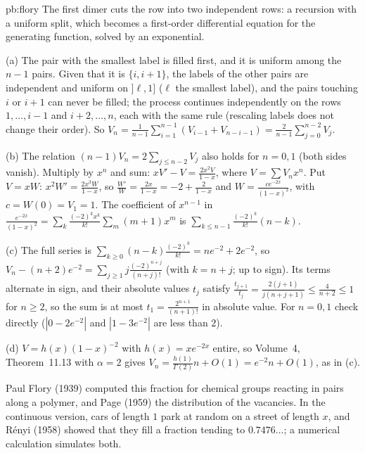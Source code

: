 \begin{solution}{pb:flory}
\idea The first dimer cuts the row into two independent rows: a recursion with a uniform split, which becomes a first-order differential equation for the generating
function, solved by an exponential.

\writeup (a) The pair with the smallest label is filled first, and it is uniform among the $n-1$ pairs. Given that it is $\{i,i+1\}$, the labels of the other pairs are independent and
uniform on $]\ell,1]$ ($\ell$ the smallest label), and the pairs touching $i$ or $i+1$ can never be filled; the process continues independently on the rows $1,\dots,i-1$ and
$i+2,\dots,n$, each with the same rule (rescaling labels does not change their order). So $V_n=\frac1{n-1}\sum_{i=1}^{n-1}(V_{i-1}+V_{n-i-1})=\frac2{n-1}\sum_{j=0}^{n-2}V_j$.

(b) The relation $(n-1)V_n=2\sum_{j\le n-2}V_j$ also holds for $n=0,1$ (both sides vanish). Multiply by $x^n$ and sum: $xV'-V=\frac{2x^2V}{1-x}$, where $V=\sum V_nx^n$. Put $V=xW$:
$x^2W'=\frac{2x^3W}{1-x}$, so $\frac{W'}W=\frac{2x}{1-x}=-2+\frac2{1-x}$ and $W=\frac{ce^{-2x}}{(1-x)^2}$, with $c=W(0)=V_1=1$. The coefficient of $x^{n-1}$ in $\frac{e^{-2x}}{(1-x)^2}=\sum_k\frac{(-2)^kx^k}{k!}\sum_m(m+1)x^m$ is
$\sum_{k\le n-1}\frac{(-2)^k}{k!}(n-k)$.

(c) The full series is $\sum_{k\ge0}(n-k)\frac{(-2)^k}{k!}=ne^{-2}+2e^{-2}$, so $V_n-(n+2)e^{-2}=\sum_{j\ge1}j\frac{(-2)^{n+j}}{(n+j)!}$ (with $k=n+j$; up to sign). Its terms alternate in sign, and their absolute values $t_j$
satisfy $\frac{t_{j+1}}{t_j}=\frac{2(j+1)}{j(n+j+1)}\le\frac4{n+2}\le1$ for $n\ge2$, so the sum is at most $t_1=\frac{2^{n+1}}{(n+1)!}$ in absolute value. For $n=0,1$ check directly ($|0-2e^{-2}|$ and $|1-3e^{-2}|$ are less than $2$).

(d) $V=h(x)(1-x)^{-2}$ with $h(x)=xe^{-2x}$ entire, so Volume~4, Theorem~11.13 with $\alpha=2$ gives $V_n=\frac{h(1)}{\Gamma(2)}n+O(1)=e^{-2}n+O(1)$, as in (c).

\leads Paul Flory (1939) computed this fraction for chemical groups reacting in pairs along a polymer, and Page (1959) the distribution of the vacancies. In the continuous
version, cars of length $1$ park at random on a street of length $x$, and R\'enyi (1958) showed that they fill a fraction tending to $0.7476\ldots$; a numerical calculation simulates both.
\end{solution}

